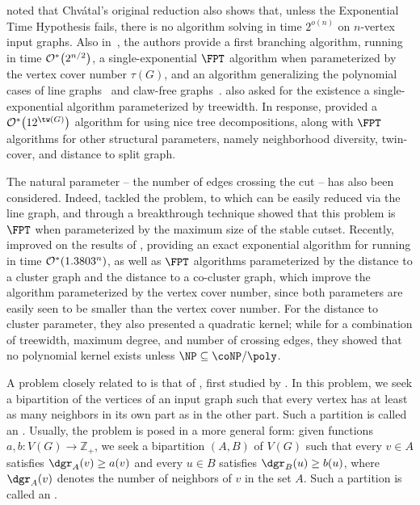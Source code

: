 \cite{matching_cut_tcs} noted that Chv\'atal's original reduction also shows that, unless the Exponential Time Hypothesis fails, there is no algorithm solving  in time $2^{o(n)}$ on $n$-vertex input graphs.
Also in~\citep{matching_cut_tcs}, the authors provide a first branching algorithm, running in time $\mathcal{O}^*\!\left(2^{n/2}\right)$, a single-exponential $\FPT$ algorithm when parameterized by the vertex cover number $\tau(G)$, and an algorithm generalizing the polynomial cases of line graphs~\citep{matching_cut_moshi} and claw-free graphs~\citep{matching_cut_planar}.
\cite{matching_cut_tcs} also asked for the existence a single-exponential algorithm parameterized by treewidth.
In response, \cite{matching_cut_structural} provided a $\bigOs{12^{\tw(G)}}$ algorithm for  using nice tree decompositions, along with $\FPT$ algorithms for other structural parameters, namely neighborhood diversity, twin-cover, and distance to split graph.

The natural parameter -- the number of edges crossing the cut -- has also been considered.
Indeed, \cite{marx_treewidth_reduction} tackled the  problem, to which  can be easily reduced via the line graph, and through a breakthrough technique showed that this problem is $\FPT$ when parameterized by the maximum size of the stable cutset.
Recently, \cite{matching_cut_ipec} improved on the results of \cite{matching_cut_tcs}, providing an exact exponential algorithm for  running in  time $\mathcal{O}^*\!\left(1.3803^n\right)$, as well as $\FPT$ algorithms parameterized by the distance to a cluster graph and the distance to a co-cluster graph, which improve the algorithm parameterized by the vertex cover number, since both parameters are easily seen to be smaller than the vertex cover number.
For the distance to cluster parameter, they also presented a quadratic kernel; while for a combination of treewidth, maximum degree, and number of crossing edges, they showed that no polynomial kernel exists unless $\NP \subseteq \coNP/\poly$.

A problem  closely related to  is that of , first studied by \cite{internal_partition_thomassen}.
In this problem, we seek a bipartition of the vertices of an input graph such that every vertex has at least as many neighbors in its
own part as in the other part. Such a partition is called an .
Usually, the problem is posed in a more general form: given functions $a,b: V(G) \rightarrow \mathbb{Z}_+$, we seek a bipartition $(A,B)$ of $V(G)$ such that every $v \in A$ satisfies $\dgr_A(v) \geq a(v)$ and every $u \in B$ satisfies $\dgr_B(u) \geq b(u)$, where $\dgr_A(v)$ denotes the number of neighbors of $v$ in the set $A$. Such a partition is called an .

